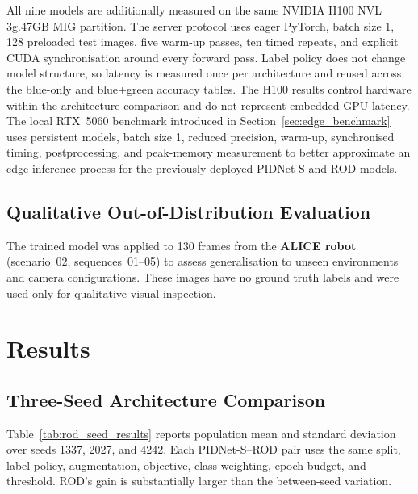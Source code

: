 \documentclass[12pt,a4paper]{report}
\begin{document}
All nine models are additionally measured on the same NVIDIA H100 NVL
3g.47GB MIG partition. The server protocol uses eager PyTorch, batch size 1,
128 preloaded test images, five warm-up passes, ten timed repeats, and explicit
CUDA synchronisation around every forward pass. Label policy does not change
model structure, so latency is measured once per architecture and reused across
the blue-only and blue+green accuracy tables. The H100 results control hardware
within the architecture comparison and do not represent embedded-GPU latency.
The local RTX~5060 benchmark introduced in Section~\ref{sec:edge_benchmark}
uses persistent models, batch size 1, reduced precision, warm-up, synchronised
timing, postprocessing, and peak-memory measurement to better approximate an
edge inference process for the previously deployed PIDNet-S and ROD models.

\section{Qualitative Out-of-Distribution Evaluation}

The trained model was applied to 130 frames from the \textbf{ALICE robot} (scenario~02, sequences~01--05) to assess generalisation to unseen environments and camera configurations.
These images have no ground truth labels and were used only for qualitative visual inspection.


\chapter{Results}
\label{sec:results}

\section{Three-Seed Architecture Comparison}

Table~\ref{tab:rod_seed_results} reports population mean and standard deviation
over seeds 1337, 2027, and 4242. Each PIDNet-S--ROD pair uses the same split,
label policy, augmentation, objective, class weighting, epoch budget, and
threshold. ROD's gain is substantially larger than the between-seed variation.
\end{document}
